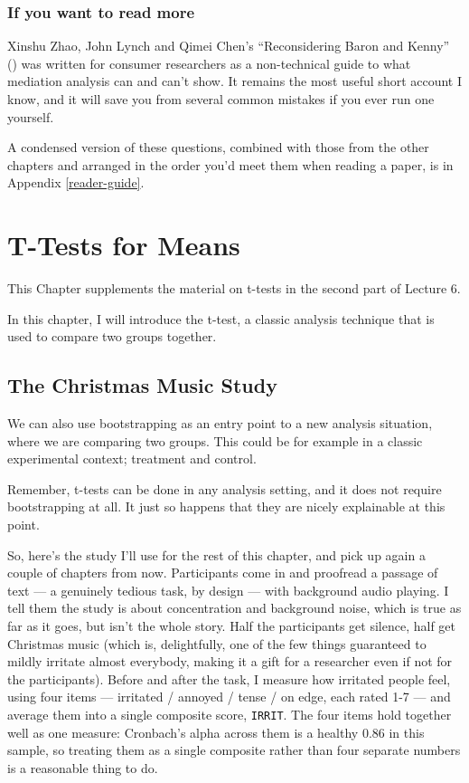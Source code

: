 \documentclass[
]{book}
\begin{document}
\subsection{If you want to read more}\label{if-you-want-to-read-more-4}

Xinshu Zhao, John Lynch and Qimei Chen's ``Reconsidering Baron and Kenny'' () was written for consumer researchers as a non-technical guide to what mediation analysis can and can't show. It remains the most useful short account I know, and it will save you from several common mistakes if you ever run one yourself.

A condensed version of these questions, combined with those from the other chapters and arranged in the order you'd meet them when reading a paper, is in Appendix \ref{reader-guide}.

\chapter{T-Tests for Means}\label{t-test}

This Chapter supplements the material on t-tests in the second part of Lecture 6.

In this chapter, I will introduce the t-test, a classic analysis technique that is used to compare two groups together.

\section{The Christmas Music Study}\label{the-christmas-music-study}

We can also use bootstrapping as an entry point to a new analysis situation, where we are comparing two groups. This could be for example in a classic experimental context; treatment and control.

Remember, t-tests can be done in any analysis setting, and it does not require bootstrapping at all. It just so happens that they are nicely explainable at this point.

So, here's the study I'll use for the rest of this chapter, and pick up again a couple of chapters from now. Participants come in and proofread a passage of text --- a genuinely tedious task, by design --- with background audio playing. I tell them the study is about concentration and background noise, which is true as far as it goes, but isn't the whole story. Half the participants get silence, half get Christmas music (which is, delightfully, one of the few things guaranteed to mildly irritate almost everybody, making it a gift for a researcher even if not for the participants). Before and after the task, I measure how irritated people feel, using four items --- irritated / annoyed / tense / on edge, each rated 1-7 --- and average them into a single composite score, \texttt{IRRIT}. The four items hold together well as one measure: Cronbach's alpha across them is a healthy 0.86 in this sample, so treating them as a single composite rather than four separate numbers is a reasonable thing to do.
\end{document}
